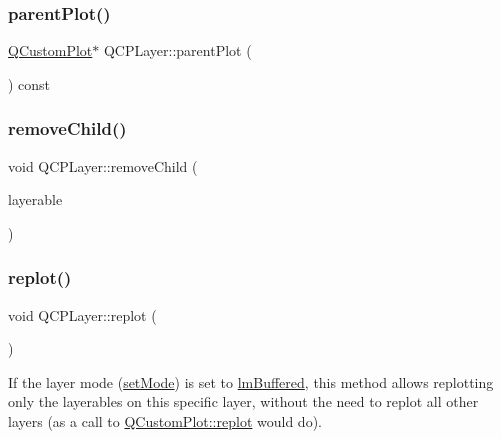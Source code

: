\mbox{\label{class_q_c_p_layer_a5520019787482e13857ebe631c27c3fa}} 
\subsubsection{\texorpdfstring{parent\+Plot()}{parentPlot()}}
{\footnotesize\ttfamily \hyperlink{class_q_custom_plot}{Q\+Custom\+Plot}$\ast$ Q\+C\+P\+Layer\+::parent\+Plot (\begin{DoxyParamCaption}{ }\end{DoxyParamCaption}) const\hspace{0.3cm}{\ttfamily [inline]}}

\mbox{\label{class_q_c_p_layer_ac2f64ac7761650582d968d86670ef362}} 
\subsubsection{\texorpdfstring{remove\+Child()}{removeChild()}}
{\footnotesize\ttfamily void Q\+C\+P\+Layer\+::remove\+Child (\begin{DoxyParamCaption}\item[{\hyperlink{class_q_c_p_layerable}{Q\+C\+P\+Layerable} $\ast$}]{layerable }\end{DoxyParamCaption})\hspace{0.3cm}{\ttfamily [protected]}}

\mbox{\label{class_q_c_p_layer_adefd53b6db02f470151c416f42e37180}} 
\subsubsection{\texorpdfstring{replot()}{replot()}}
{\footnotesize\ttfamily void Q\+C\+P\+Layer\+::replot (\begin{DoxyParamCaption}{ }\end{DoxyParamCaption})}

If the layer mode (\hyperlink{class_q_c_p_layer_a938d57b04f4e4c23cedf1711f983919b}{set\+Mode}) is set to \hyperlink{class_q_c_p_layer_a67dcfc1590be2a1f2227c5a39bb59c7cab581b9fab3007c4c65f057f4185d7538}{lm\+Buffered}, this method allows replotting only the layerables on this specific layer, without the need to replot all other layers (as a call to \hyperlink{class_q_custom_plot_aa4bfe7d70dbe67e81d877819b75ab9af}{Q\+Custom\+Plot\+::replot} would do).

